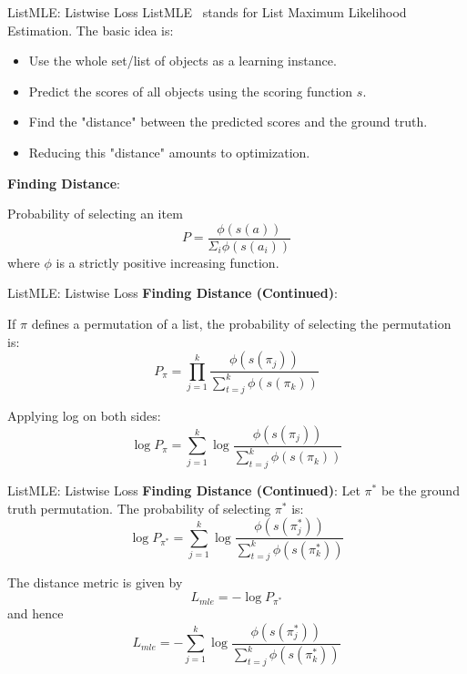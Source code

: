 \documentclass{beamer}
\begin{document}
\begin{frame}[t]{ListMLE: Listwise Loss}
ListMLE~\cite{listmlepaper} stands for List Maximum Likelihood Estimation.
The basic idea is:
\begin{itemize}
\item Use the whole set/list of objects as a learning instance.
\item Predict the scores of all objects using the scoring function $s$.
\item Find the "distance" between the predicted scores and the ground truth.
\item Reducing this "distance" amounts to optimization.
\end{itemize}

\textbf{Finding Distance}:

Probability of selecting an item
$$
P = \frac{\phi(s(a))}{\Sigma_i \phi(s(a_i))} 
$$
where $\phi$ is a strictly positive increasing function.
\end{frame}

\begin{frame}[t]{ListMLE: Listwise Loss}
\textbf{Finding Distance (Continued)}:

If $\pi$ defines a permutation of a list,  the probability of selecting the permutation is:
$$
P_{\pi} = \prod\limits_{j=1}^{k} \frac{\phi(s(\pi_j))}{ \sum\limits_{t=j}^k \phi(s(\pi_k))}
$$

Applying log on both sides:
$$
\log P_{\pi} = \sum\limits_{j=1}^{k} \log \frac{\phi(s(\pi_j))}{ \sum\limits_{t=j}^k \phi(s(\pi_k))}
$$

\end{frame}


\begin{frame}[t]{ListMLE: Listwise Loss}
\textbf{Finding Distance (Continued)}:
Let $\pi^*$ be the ground truth permutation. The probability of selecting $\pi^*$ is:
$$
\log P_{\pi^*} = \sum\limits_{j=1}^{k} \log \frac{\phi(s(\pi^*_j))}{ \sum\limits_{t=j}^k \phi(s(\pi^*_k))}
$$

The distance metric is given by
$$
L_{mle} = - \log P_{\pi^*}
$$
and hence
$$
L_{mle} = -  \sum\limits_{j=1}^{k} \log \frac{\phi(s(\pi^*_j))}{ \sum\limits_{t=j}^k \phi(s(\pi^*_k))}
$$

\end{frame}
\end{document}
